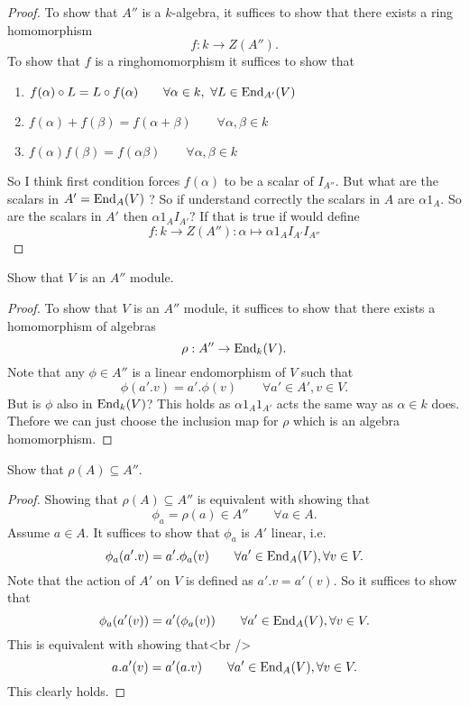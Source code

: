 \begin{proof}
To show that $A''$ is a $k$-algebra, it suffices to show that there exists a ring homomorphism
$$
f: k \rightarrow  Z(A'').
$$
To show that $f$ is a ringhomomorphism it suffices to show that

\begin{enumerate}
  \item $f(\alpha )\circ L=L\circ f(\alpha ) \qquad \forall \alpha \in k,\  \forall L\in \operatorname{End}_{A'}(V)$
  \item $f(\alpha )+f(\beta )=f(\alpha +\beta ) \qquad \forall \alpha ,\beta \in k$
  \item $f(\alpha )f(\beta )=f(\alpha \beta ) \qquad \forall \alpha ,\beta \in k$
\end{enumerate}

So I think first condition forces $f(\alpha )$ to be a scalar of $I_{A''}$. But what are the scalars in $A'=\operatorname{End}_A(V)$ ? So if understand correctly the scalars in $A$ are $\alpha 1_A$. So are the scalars in $A'$ then $\alpha 1_AI_{A'}$? If that is true if would define
$$
f:k \rightarrow Z(A'') : \alpha \mapsto \alpha 1_AI_{A'}I_{A''}
$$

\end{proof}


\begin{prop}
Show that \(V\) is an \(A''\) module.
\end{prop}

\begin{proof}
To show that \(V\) is an \(A''\) module, it suffices to show that there exists a homomorphism of algebras
\[
\rho :A''\rightarrow \operatorname{End}_{k}(V).
\]
Note that any \(\phi \in A''\) is a linear endomorphism of \(V\) such that
\[
\phi (a'.v)=a'.\phi (v) \qquad \forall a'\in A',v\in V.
\]
But is \(\phi \) also in \(\operatorname{End}_{k}(V)\)? This holds as \(\alpha 1_A1_{A'}\) acts the same way as $\alpha \in k$ does. Thefore we can just choose the inclusion map for \(\rho \) which is an algebra homomorphism.
\end{proof}

\begin{prop}
Show that \(\rho (A)\subseteq A''.\)
\end{prop}

\begin{proof}
Showing that \(\rho (A)\subseteq A''\) is equivalent with showing that
\[
\phi _{a}=\rho (a)\in A'' \qquad \forall a\in A.
\]
Assume \(a\in A\). It suffices to show that \(\phi _{a}\) is \(A'\) linear, i.e.
\[
\phi _{a}(a'.v)=a'.\phi _{a}(v) \qquad \forall a'\in \operatorname{End}_A(V), \forall v\in V.
\]
Note that the action of \(A'\) on \(V\) is defined as \(a'.v=a'(v)\). So it suffices to show that
\[
\phi _{a}(a'(v))=a'(\phi _{a}(v))  \qquad \forall a'\in \operatorname{End}_A(V), \forall v\in V.
\]
This is equivalent with showing that<br />
\[
a.a'(v)=a'(a.v) \qquad \forall a'\in \operatorname{End}_A(V), \forall v\in V.
\]
This clearly holds.
\end{proof}

